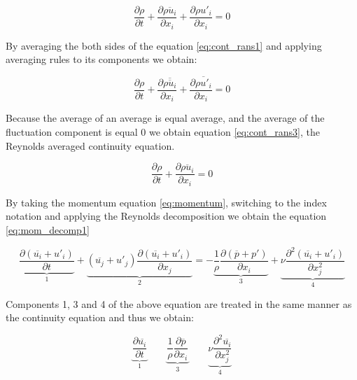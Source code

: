 \begin{equation} \label{eq:cont_rans1}
\frac{\partial \rho}{\partial t} + \frac{\partial \overline{\rho u_i}}{\partial x_i} + \frac{\partial \rho u'_i}{\partial x_i} = 0
\end{equation}

By averaging the both sides of the equation  \ref{eq:cont_rans1} and applying averaging rules to its components we obtain:

\begin{equation} \label{eq:cont_rans2}
\frac{\partial \rho}{\partial t} + \frac{\partial \overline{\overline{\rho u_i}}}{\partial x_i} + \frac{\partial \overline{\rho u'_i}}{\partial x_i} = 0
\end{equation}

Because the average of an average is equal average, and  the average of the fluctuation component is equal 0 we obtain equation \ref{eq:cont_rans3}, the Reynolds averaged continuity equation.

\begin{equation} \label{eq:cont_rans3}
\frac{\partial \rho}{\partial t} + \frac{\partial \overline{\rho u_i}}{\partial x_i} = 0
\end{equation}

By taking the momentum equation \ref{eq:momentum}, switching to the index notation and applying the Reynolds decomposition we obtain the equation \ref{eq:mom_decomp1}

\begin{equation} \label{eq:mom_decomp1}
\underbrace{\frac{\partial \left( \overline{u_i} + u'_i \right)}{\partial t}}_\text{1} 
+ \underbrace{\left( \overline{u_j} + u'_j \right) \frac{\partial \left( \overline{u_i} + u'_i \right)}{\partial x_j}}_\text{2} 
=
- \underbrace{\frac{1}{\rho} \frac{\partial \left( \overline{p} + p' \right)}{\partial x_i}}_\text{3} 
+ \underbrace{\nu \frac{\partial^2 \left( \overline{u_i} + u'_i \right)}{\partial x_j^2}}_\text{4} 
\end{equation}

Components 1, 3 and 4 of the above equation are treated in the same manner as the continuity equation and thus we obtain:

\begin{equation} \label{eq:mom_components}
\underbrace{\frac{\partial \overline{u_i}}{\partial t}}_\text{1}
\qquad
\underbrace{\frac{1}{\rho} \frac{\partial \overline{p}}{\partial x_i}}_\text{3}
\qquad
\underbrace{\nu \frac{\partial^2 \overline{u_i}}{\partial x_j^2}}_\text{4}
\end{equation}

